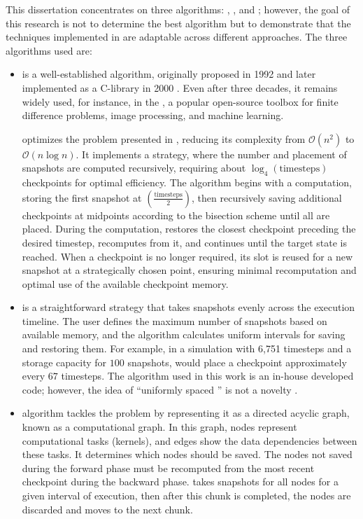 \documentclass[Ingles,Final]{ic-tese-v3}
\begin{document}
This dissertation concentrates on three \checkpointing algorithms: \revolve \cite{revolve}, \uniform, and \zcut \cite{zcut}; however, the goal of this research is not to determine the best algorithm but to demonstrate that the techniques implemented in \gpuzip are adaptable across different \checkpointing approaches. The three \checkpointing algorithms used are:

\begin{itemize}
    \item \textbf{\revolve} \cite{revolve} is a well-established \checkpointing algorithm, originally proposed in 1992 \cite{revolve1992} and later implemented as a C-library in 2000 \cite{revolve}. Even after three decades, it remains widely used, for instance, in the  \cite{devito-api, devito-compiler}, a popular open-source toolbox for finite difference problems, image processing, and machine learning. 
    
      \revolve optimizes the problem presented in , reducing its complexity from $\mathcal{O}(n^2)$ to $\mathcal{O}(n \log n)$. It implements a  strategy, where the number and placement of snapshots are computed recursively, requiring about $\log_4(\text{timesteps})$ checkpoints for optimal efficiency. The algorithm begins with a \fwd computation, storing the first snapshot at $(\frac{\text{timesteps}}{2})$, then recursively saving additional checkpoints at midpoints according to the bisection scheme until all are placed. During the \bwd computation, \revolve restores the closest checkpoint preceding the desired \bwd timestep, recomputes \fwd from it, and continues until the target state is reached. When a checkpoint is no longer required, its slot is reused for a new snapshot at a strategically chosen point, ensuring minimal recomputation and optimal use of the available checkpoint memory.

    \item \textbf{\uniform} is a straightforward \checkpointing strategy that takes snapshots evenly across the execution timeline. The user defines the maximum number of snapshots based on available memory, and the algorithm calculates uniform intervals for saving and restoring them. For example, in a simulation with 6,751 timesteps and a storage capacity for $100$ snapshots, \uniform would place a checkpoint approximately every $67$ timesteps. The \uniform algorithm used in this work is an in-house developed code; however, the idea of ``uniformly spaced \checkpointing'' is not a novelty \cite{ahlroth2011}.

    \item \textbf{\zcut}\cite{zcut} algorithm tackles the problem by representing it as a directed acyclic graph, known as a computational graph. In this graph, nodes represent computational tasks (kernels), and edges show the data dependencies between these tasks. It determines which nodes should be saved. The nodes not saved during the forward phase must be recomputed from the most recent checkpoint during the backward phase. \zcut takes snapshots for all nodes for a given interval of execution, then after this chunk is completed, the nodes are discarded and moves to the next chunk.
\end{itemize}
\end{document}
